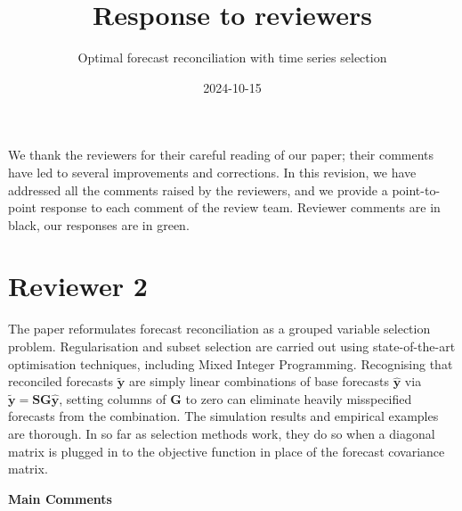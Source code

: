 \documentclass[11pt,a4paper,]{article}
\title{Response to reviewers}
\author{Optimal forecast reconciliation with time series selection}
\date{2024-10-15}
\begin{document}
\vspace*{-2cm}
\begin{snugshade}\sffamily
\maketitle
\end{snugshade}\vspace*{0.5cm}


We thank the reviewers for their careful reading of our paper; their
comments have led to several improvements and corrections. In this
revision, we have addressed all the comments raised by the reviewers,
and we provide a point-to-point response to each comment of the review
team. Reviewer comments are in black, our responses are in green.

\section*{Reviewer 2}\label{reviewer-2}

The paper reformulates forecast reconciliation as a grouped variable
selection problem. Regularisation and subset selection are carried out
using state-of-the-art optimisation techniques, including Mixed Integer
Programming. Recognising that reconciled forecasts \(\tilde{\bm{y}}\)
are simply linear combinations of base forecasts \(\hat{\bm{y}}\) via
\(\tilde{\bm{y}}=\bm{SG}\hat{\bm{y}}\), setting columns of \(\bm{G}\) to
zero can eliminate heavily misspecified forecasts from the combination.
The simulation results and empirical examples are thorough. In so far as
selection methods work, they do so when a diagonal matrix is plugged in
to the objective function in place of the forecast covariance matrix.

\textbf{Main Comments}
\end{document}
